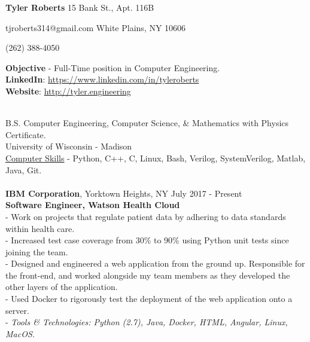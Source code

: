 \documentclass{resume}
\begin{document}
\begin{adjustwidth}{75mm}{}
{\LARGE \bf Tyler Roberts} \hfill 15 Bank St., Apt. 116B
\end{adjustwidth}
\begin{adjustwidth}{80mm}{}
{\normalsize tjroberts314@gmail.com} \hfill White Plains, NY 10606
\end{adjustwidth}
\begin{adjustwidth}{87.5mm}{}
{\normalsize (262) 388-4050}
\end{adjustwidth}
\begin{flushleft}
	\textbf{Objective} - Full-Time position in Computer Engineering. \\
	\textbf{LinkedIn}:
	\href{https://www.linkedin.com/in/tyleroberts}{https://www.linkedin.com/in/tyleroberts} \\
	\textbf{Website}:
	\href{http://tyler.engineering}{http://tyler.engineering} \vspace{\baselineskip}

 \\
{\bigsize
B.S. Computer Engineering, Computer Science, \& Mathematics with Physics Certificate. \\
University of Wisconsin - Madison \\
\underline{Computer Skills} - Python, C++, C, Linux, Bash, Verilog, SystemVerilog, Matlab, Java, Git.} \\[5mm]
\\[2mm]

\textbf{IBM Corporation}, Yorktown Heights, NY \hfill July 2017 - Present\\
\textbf{Software Engineer, Watson Health Cloud}\\
{\footnotesize
	\ttab- Work on projects that regulate patient data by adhering to data standards within health care.\\
	\ttab- Increased test case coverage from 30\% to 90\% using Python unit tests since joining the team. \\
	\ttab- Designed and engineered a web application from the ground up. Responsible for the front-end, and worked alongside \ttab my team members as they developed the other layers of the application. \\
	\ttab - Used Docker to rigorously test the deployment of the web application onto a server. \\
	\ttab- \textit{Tools \& Technologies: Python (2.7), Java, Docker, HTML, Angular, Linux, MacOS.}\\[3mm]
}


\end{flushleft}
\end{document}

